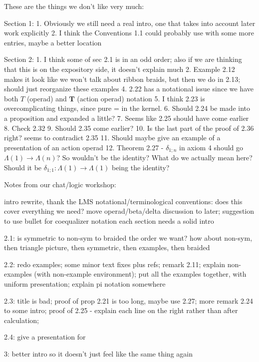 These are the things we don't like very much:

Section 1:
1. Obviously we still need a real intro, one that takes into account later work explicitly
2. I think the Conventions 1.1 could probably use with some more entries, maybe a better location

Section 2:
1. I think some of sec 2.1 is in an odd order; also if we are thinking that this is on the expository side, it doesn't explain much
2. Example 2.12 makes it look like we won't talk about ribbon braids, but then we do in 2.13; should just reorganize these examples
4. 2.22 has a notational issue since we have both $T$ (operad) and $\mathbf{T}$ (action operad) notation
5. I think 2.23 is overcomplicating things, since pure = in the kernel.
6. Should 2.24 be made into a proposition and expanded a little?
7. Seems like 2.25 should have come earlier
8. Check 2.32
9. Should 2.35 come earlier?
10. Is the last part of the proof of 2.36 right? seems to contradict 2.35
11. Should maybe give an example of a presentation of an action operad 
12. Theorem 2.27 - $\delta_{1;n}$ in axiom 4 should go $\Lambda(1) \rightarrow \Lambda(n)$? So wouldn't be the identity? What do we actually mean here? Should it be $\delta_{1;1} \colon \Lambda(1) \rightarrow \Lambda(1)$ being the identity?


Notes from our chat/logic workshop:

intro rewrite, thank the LMS 
notational/terminological conventions: does this cover everything we need? move operad/beta/delta discussion to later; suggestion to use bullet for coequalizer notation
each section needs a solid intro

2.1: is symmetric to non-sym to braided the order we want? how about non-sym, then triangle picture, then symmetric, then examples, then braided

2.2: redo examples; some minor text fixes plus refs; remark 2.11; explain non-examples (with non-example environment); put all the examples together, with uniform presentation; explain pi notation somewhere

2.3: title is bad; proof of prop 2.21 is too long, maybe use 2.27; more remark 2.24 to some intro; proof of 2.25 - explain each line on the right rather than after calculation; 

2.4: give a presentation for \Sigma [NG]

3: better intro so it doesn't just feel like the same thing again

